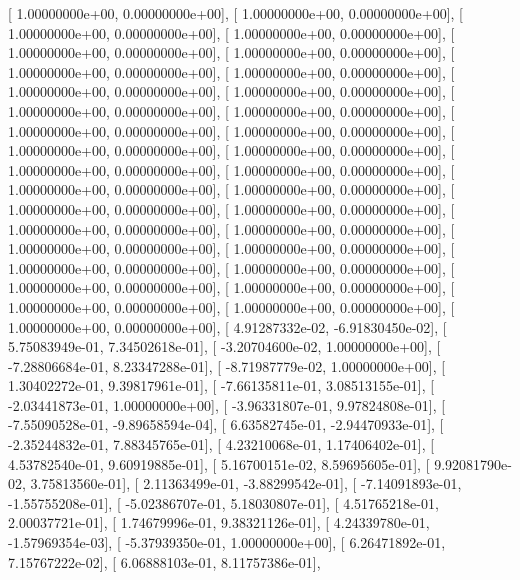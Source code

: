 \documentclass{article}
\begin{document}
       [  1.00000000e+00,   0.00000000e+00],
       [  1.00000000e+00,   0.00000000e+00],
       [  1.00000000e+00,   0.00000000e+00],
       [  1.00000000e+00,   0.00000000e+00],
       [  1.00000000e+00,   0.00000000e+00],
       [  1.00000000e+00,   0.00000000e+00],
       [  1.00000000e+00,   0.00000000e+00],
       [  1.00000000e+00,   0.00000000e+00],
       [  1.00000000e+00,   0.00000000e+00],
       [  1.00000000e+00,   0.00000000e+00],
       [  1.00000000e+00,   0.00000000e+00],
       [  1.00000000e+00,   0.00000000e+00],
       [  1.00000000e+00,   0.00000000e+00],
       [  1.00000000e+00,   0.00000000e+00],
       [  1.00000000e+00,   0.00000000e+00],
       [  1.00000000e+00,   0.00000000e+00],
       [  1.00000000e+00,   0.00000000e+00],
       [  1.00000000e+00,   0.00000000e+00],
       [  1.00000000e+00,   0.00000000e+00],
       [  1.00000000e+00,   0.00000000e+00],
       [  1.00000000e+00,   0.00000000e+00],
       [  1.00000000e+00,   0.00000000e+00],
       [  1.00000000e+00,   0.00000000e+00],
       [  1.00000000e+00,   0.00000000e+00],
       [  1.00000000e+00,   0.00000000e+00],
       [  1.00000000e+00,   0.00000000e+00],
       [  1.00000000e+00,   0.00000000e+00],
       [  1.00000000e+00,   0.00000000e+00],
       [  1.00000000e+00,   0.00000000e+00],
       [  1.00000000e+00,   0.00000000e+00],
       [  1.00000000e+00,   0.00000000e+00],
       [  1.00000000e+00,   0.00000000e+00],
       [  1.00000000e+00,   0.00000000e+00],
       [  4.91287332e-02,  -6.91830450e-02],
       [  5.75083949e-01,   7.34502618e-01],
       [ -3.20704600e-02,   1.00000000e+00],
       [ -7.28806684e-01,   8.23347288e-01],
       [ -8.71987779e-02,   1.00000000e+00],
       [  1.30402272e-01,   9.39817961e-01],
       [ -7.66135811e-01,   3.08513155e-01],
       [ -2.03441873e-01,   1.00000000e+00],
       [ -3.96331807e-01,   9.97824808e-01],
       [ -7.55090528e-01,  -9.89658594e-04],
       [  6.63582745e-01,  -2.94470933e-01],
       [ -2.35244832e-01,   7.88345765e-01],
       [  4.23210068e-01,   1.17406402e-01],
       [  4.53782540e-01,   9.60919885e-01],
       [  5.16700151e-02,   8.59695605e-01],
       [  9.92081790e-02,   3.75813560e-01],
       [  2.11363499e-01,  -3.88299542e-01],
       [ -7.14091893e-01,  -1.55755208e-01],
       [ -5.02386707e-01,   5.18030807e-01],
       [  4.51765218e-01,   2.00037721e-01],
       [  1.74679996e-01,   9.38321126e-01],
       [  4.24339780e-01,  -1.57969354e-03],
       [ -5.37939350e-01,   1.00000000e+00],
       [  6.26471892e-01,   7.15767222e-02],
       [  6.06888103e-01,   8.11757386e-01],
\end{document}
